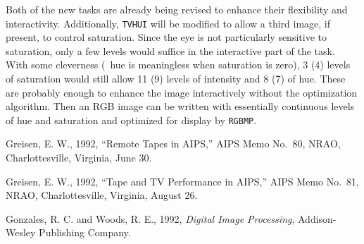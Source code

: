 Both of the new tasks are already being revised to enhance their
flexibility and interactivity.  Additionally, {\tt TVHUI} will be
modified to allow a third image, if present, to control saturation.
Since the eye is not particularly sensitive to saturation, only a few
levels would suffice in the interactive part of the task.  With some
cleverness (\ie\ hue is meaningless when saturation is zero), 3 (4)
levels of saturation would still allow 11 (9) levels of intensity and
8 (7) of hue.  These are probably enough to enhance the image
interactively without the optimization algorithm.  Then an RGB image
can be written with essentially continuous levels of hue and
saturation and optimized for display by {\tt RGBMP}.

\begin{thebibliography}{9}

 Greisen, E. W., 1992, ``Remote Tapes in AIPS,'' AIPS
   Memo No.~80, NRAO, Charlottesville, Virginia, June 30.

 Greisen, E. W., 1992, ``Tape and TV Performance in
   AIPS,'' AIPS Memo No.~81, NRAO, Charlottesville, Virginia, August
   26.

 Gonzales, R. C. and Woods, R. E., 1992, {\it Digital
   Image Processing},  Addison-Wesley Publishing Company.

\end{thebibliography}


